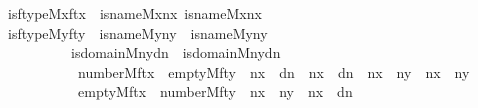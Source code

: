 \begin{isabellebody}
\ \ is{\isacharunderscore}{\kern0pt}ftype{\isacharparenleft}{\kern0pt}M{\isacharcomma}{\kern0pt}x{\isacharcomma}{\kern0pt}ftx{\isacharparenright}{\kern0pt}\ {\isasymand}\ is{\isacharunderscore}{\kern0pt}name{}{\isacharparenleft}{\kern0pt}M{\isacharcomma}{\kern0pt}x{\isacharcomma}{\kern0pt}n{}x{\isacharparenright}{\kern0pt}{\isasymand}\ is{\isacharunderscore}{\kern0pt}name{}{\isacharparenleft}{\kern0pt}M{\isacharcomma}{\kern0pt}x{\isacharcomma}{\kern0pt}n{}x{\isacharparenright}{\kern0pt}\ {\isasymand}\isanewline
\ \ is{\isacharunderscore}{\kern0pt}ftype{\isacharparenleft}{\kern0pt}M{\isacharcomma}{\kern0pt}y{\isacharcomma}{\kern0pt}fty{\isacharparenright}{\kern0pt}\ {\isasymand}\ is{\isacharunderscore}{\kern0pt}name{}{\isacharparenleft}{\kern0pt}M{\isacharcomma}{\kern0pt}y{\isacharcomma}{\kern0pt}n{}y{\isacharparenright}{\kern0pt}\ {\isasymand}\ is{\isacharunderscore}{\kern0pt}name{}{\isacharparenleft}{\kern0pt}M{\isacharcomma}{\kern0pt}y{\isacharcomma}{\kern0pt}n{}y{\isacharparenright}{\kern0pt}\isanewline
\ \ \ \ \ \ \ \ \ \ {\isasymand}\ is{\isacharunderscore}{\kern0pt}domain{\isacharparenleft}{\kern0pt}M{\isacharcomma}{\kern0pt}n{}y{\isacharcomma}{\kern0pt}dn{}{\isacharparenright}{\kern0pt}\ {\isasymand}\ is{\isacharunderscore}{\kern0pt}domain{\isacharparenleft}{\kern0pt}M{\isacharcomma}{\kern0pt}n{}y{\isacharcomma}{\kern0pt}dn{}{\isacharparenright}{\kern0pt}\ {\isasymand}\ \isanewline
\ \ \ \ \ \ \ \ \ \ {\isacharparenleft}{\kern0pt}\ \ {\isacharparenleft}{\kern0pt}number{}{\isacharparenleft}{\kern0pt}M{\isacharcomma}{\kern0pt}ftx{\isacharparenright}{\kern0pt}\ {\isasymand}\ empty{\isacharparenleft}{\kern0pt}M{\isacharcomma}{\kern0pt}fty{\isacharparenright}{\kern0pt}\ {\isasymand}\ {\isacharparenleft}{\kern0pt}n{}x\ {\isasymin}\ dn{}\ {\isasymor}\ n{}x\ {\isasymin}\ dn{}{\isacharparenright}{\kern0pt}\ {\isasymand}\ {\isacharparenleft}{\kern0pt}n{}x\ {\isacharequal}{\kern0pt}\ n{}y\ {\isasymor}\ n{}x\ {\isacharequal}{\kern0pt}\ n{}y{\isacharparenright}{\kern0pt}{\isacharparenright}{\kern0pt}\isanewline
\ \ \ \ \ \ \ \ \ \ \ {\isasymor}\ {\isacharparenleft}{\kern0pt}empty{\isacharparenleft}{\kern0pt}M{\isacharcomma}{\kern0pt}ftx{\isacharparenright}{\kern0pt}\ {\isasymand}\ number{}{\isacharparenleft}{\kern0pt}M{\isacharcomma}{\kern0pt}fty{\isacharparenright}{\kern0pt}\ {\isasymand}\ n{}x\ {\isacharequal}{\kern0pt}\ n{}y\ {\isasymand}\ n{}x\ {\isasymin}\ dn{}{\isacharparenright}{\kern0pt}{\isacharparenright}{\kern0pt}{\isachardoublequoteclose}\isanewline

\end{isabellebody}
